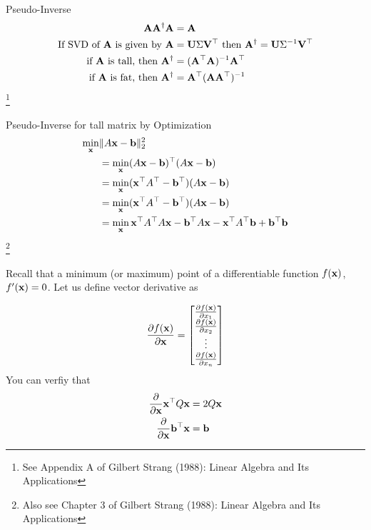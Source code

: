 \documentclass[times]{beamer}
\begin{document}
  \begin{frame}{Pseudo-Inverse}
    \begin{align}
      \mathbf{A} \mathbf{A}^\dagger \mathbf{A} &=  \mathbf{A} \\
      \text{If SVD of $\mathbf{A}$ is given by } \mathbf{A} &= \mathbf{U} \Sigma \mathbf{V}^\top 
      \text{ then } \mathbf{A}^\dagger = \mathbf{U} \Sigma^{-1} \mathbf{V}^\top \\
      \text{if } \mathbf{A} \text{ is tall, then } \mathbf{A}^\dagger &= (\mathbf{A}^\top \mathbf{A})^{-1} \mathbf{A}^\top \\
      \text{if } \mathbf{A} \text{ is fat, then } \mathbf{A}^\dagger &=  \mathbf{A}^\top (\mathbf{A} \mathbf{A}^\top)^{-1}
    \end{align}\footnote{See Appendix A of Gilbert Strang (1988): Linear Algebra
    and Its Applications}

  \end{frame}
  \begin{frame}{Pseudo-Inverse for tall matrix by Optimization}
    \begin{align}
      \min_{\mathbf{x}} &\|A\mathbf{x} - \mathbf{b}\|_2^2
                    \\
      &= \min_{\mathbf{x}} (A\mathbf{x} - \mathbf{b})^\top (A\mathbf{x} - \mathbf{b})
      \\
      &= \min_{\mathbf{x}} (\mathbf{x}^\top A^\top - \mathbf{b}^\top) (A\mathbf{x} - \mathbf{b})
      \\
      &= \min_{\mathbf{x}} (\mathbf{x}^\top A^\top - \mathbf{b}^\top) (A\mathbf{x} - \mathbf{b})
      \\
      &= \min_{\mathbf{x}} \mathbf{x}^\top A^\top A\mathbf{x} - \mathbf{b}^\top A\mathbf{x} - \mathbf{x}^\top A^\top \mathbf{b} + \mathbf{b}^\top \mathbf{b}
    \end{align}\footnote{Also see Chapter 3 of Gilbert Strang (1988): Linear Algebra
      and Its Applications}
  \end{frame}

  \begin{frame}

    Recall that a minimum (or maximum) point of a differentiable function $f(\mathbf{x})$,
    $f'(\mathbf{x})  = 0$. Let us define vector derivative as

    \begin{align}
      \frac{\partial f(\mathbf{x})}{\partial \mathbf{x}} = \begin{bmatrix}
          \frac{\partial f(\mathbf{x})}{\partial x_1}
            \\
            \frac{\partial f(\mathbf{x})}{\partial x_2}
            \\
            \vdots
            \\
            \frac{\partial f(\mathbf{x})}{\partial x_n}
          \end{bmatrix}
    \end{align}
    You can verfiy that
    \begin{align}
      \frac{\partial }{\partial \mathbf{x}} \mathbf{x}^\top Q \mathbf{x} &= 2 Q\mathbf{x}
      \\
      \frac{\partial }{\partial \mathbf{x}} \mathbf{b}^\top \mathbf{x} &= \mathbf{b}
      \end{align}
  \end{frame}
\end{document}
